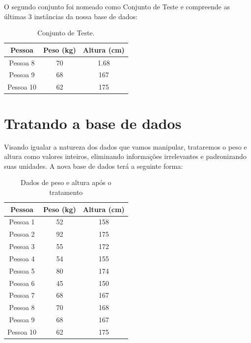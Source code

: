 \documentclass{article}
\begin{document}
    \newpage
    O segundo conjunto foi nomeado como Conjunto de Teste e compreende as últimas 3 instâncias da nossa base de dados:
    \begin{table}[ht]
        \centering
        \begin{tabular}{|c|c|c|}
        \hline
        \textbf{Pessoa} & \textbf{Peso (kg)} & \textbf{Altura (cm)} \\
        \hline
            Pessoa 8 & 70 & 1.68 \\
            Pessoa 9 & 68 & 167 \\
            Pessoa 10 & 62 & 175 \\
        \hline
        \end{tabular}
        \caption{Conjunto de Teste.}
        \label{tab:treino}
    \end{table}


\section{Tratando a base de dados}
    Visando igualar a natureza dos dados que vamos manipular, trataremos o peso e altura como valores inteiros, eliminando informações irrelevantes e padronizando suas unidades. A nova base de dados terá a seguinte forma:
    
    \begin{table}[h]
        \centering
        \begin{tabular}{|c|c|c|}
        \hline
        \textbf{Pessoa} & \textbf{Peso (kg)} & \textbf{Altura (cm)} \\
        \hline
            Pessoa 1 & 52 & 158 \\
        \hline
            Pessoa 2 & 92 & 175 \\
        \hline
            Pessoa 3 & 55 & 172 \\
        \hline
            Pessoa 4 & 54 & 155 \\
        \hline
            Pessoa 5 & 80 & 174 \\
        \hline
            Pessoa 6 & 45 & 150 \\
        \hline
            Pessoa 7 & 68 & 167 \\
        \hline
            Pessoa 8 & 70 & 168 \\
        \hline
            Pessoa 9 & 68 & 167 \\
        \hline
            Pessoa 10 & 62 & 175 \\
        \hline
        \end{tabular}
        \caption{Dados de peso e altura após o tratamento}
        \label{tab:dados}
    \end{table}
\end{document}
